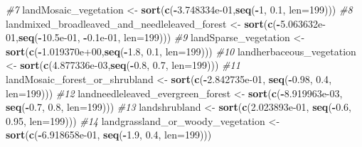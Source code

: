 \documentclass[
]{article}
\newenvironment{Shaded}{\begin{snugshade}}{\end{snugshade}}
\newcommand{\AttributeTok}[1]{\textcolor[rgb]{0.13,0.29,0.53}{#1}}
\newcommand{\CommentTok}[1]{\textcolor[rgb]{0.56,0.35,0.01}{\textit{#1}}}
\newcommand{\DecValTok}[1]{\textcolor[rgb]{0.00,0.00,0.81}{#1}}
\newcommand{\FloatTok}[1]{\textcolor[rgb]{0.00,0.00,0.81}{#1}}
\newcommand{\FunctionTok}[1]{\textcolor[rgb]{0.13,0.29,0.53}{\textbf{#1}}}
\newcommand{\NormalTok}[1]{#1}
\newcommand{\OtherTok}[1]{\textcolor[rgb]{0.56,0.35,0.01}{#1}}
\newcommand{\SpecialCharTok}[1]{\textcolor[rgb]{0.81,0.36,0.00}{\textbf{#1}}}
\begin{document}
\begin{Shaded}
\begin{Highlighting}[]
\CommentTok{\#7}
\NormalTok{landMosaic\_vegetation }\OtherTok{\textless{}{-}} \FunctionTok{sort}\NormalTok{(}\FunctionTok{c}\NormalTok{(}\SpecialCharTok{{-}}\FloatTok{3.748334e{-}01}\NormalTok{,}\FunctionTok{seq}\NormalTok{(}\SpecialCharTok{{-}}\DecValTok{1}\NormalTok{,  }\FloatTok{0.1}\NormalTok{, }\AttributeTok{len=}\DecValTok{199}\NormalTok{))) }
\CommentTok{\#8}
\NormalTok{landmixed\_broadleaved\_and\_needleleaved\_forest }\OtherTok{\textless{}{-}} \FunctionTok{sort}\NormalTok{(}\FunctionTok{c}\NormalTok{(}\SpecialCharTok{{-}}\FloatTok{5.063632e{-}01}\NormalTok{,}\FunctionTok{seq}\NormalTok{(}\SpecialCharTok{{-}}\FloatTok{10.5e{-}01}\NormalTok{, }\SpecialCharTok{{-}}\FloatTok{0.1e{-}01}\NormalTok{, }\AttributeTok{len=}\DecValTok{199}\NormalTok{))) }
\CommentTok{\#9}
\NormalTok{landSparse\_vegetation   }\OtherTok{\textless{}{-}} \FunctionTok{sort}\NormalTok{(}\FunctionTok{c}\NormalTok{(}\SpecialCharTok{{-}}\FloatTok{1.019370e+00}\NormalTok{,}\FunctionTok{seq}\NormalTok{(}\SpecialCharTok{{-}}\FloatTok{1.8}\NormalTok{, }\FloatTok{0.1}\NormalTok{, }\AttributeTok{len=}\DecValTok{199}\NormalTok{)))    }
\CommentTok{\#10}
\NormalTok{landherbaceous\_vegetation  }\OtherTok{\textless{}{-}} \FunctionTok{sort}\NormalTok{(}\FunctionTok{c}\NormalTok{(}\FloatTok{4.877336e{-}03}\NormalTok{,}\FunctionTok{seq}\NormalTok{(}\SpecialCharTok{{-}}\FloatTok{0.8}\NormalTok{, }\FloatTok{0.7}\NormalTok{, }\AttributeTok{len=}\DecValTok{199}\NormalTok{)))  }
\CommentTok{\#11}
\NormalTok{landMosaic\_forest\_or\_shrubland }\OtherTok{\textless{}{-}} \FunctionTok{sort}\NormalTok{(}\FunctionTok{c}\NormalTok{(}\SpecialCharTok{{-}}\FloatTok{2.842735e{-}01}\NormalTok{, }\FunctionTok{seq}\NormalTok{(}\SpecialCharTok{{-}}\FloatTok{0.98}\NormalTok{, }\FloatTok{0.4}\NormalTok{, }\AttributeTok{len=}\DecValTok{199}\NormalTok{)))  }
\CommentTok{\#12}
\NormalTok{landneedleleaved\_evergreen\_forest }\OtherTok{\textless{}{-}} \FunctionTok{sort}\NormalTok{(}\FunctionTok{c}\NormalTok{(}\SpecialCharTok{{-}}\FloatTok{8.919963e{-}03}\NormalTok{, }\FunctionTok{seq}\NormalTok{(}\SpecialCharTok{{-}}\FloatTok{0.7}\NormalTok{, }\FloatTok{0.8}\NormalTok{, }\AttributeTok{len=}\DecValTok{199}\NormalTok{)))  }
\CommentTok{\#13}
\NormalTok{landshrubland }\OtherTok{\textless{}{-}} \FunctionTok{sort}\NormalTok{(}\FunctionTok{c}\NormalTok{(}\FloatTok{2.023893e{-}01}\NormalTok{, }\FunctionTok{seq}\NormalTok{(}\SpecialCharTok{{-}}\FloatTok{0.6}\NormalTok{, }\FloatTok{0.95}\NormalTok{, }\AttributeTok{len=}\DecValTok{199}\NormalTok{)))  }
\CommentTok{\#14}
\NormalTok{landgrassland\_or\_woody\_vegetation }\OtherTok{\textless{}{-}} \FunctionTok{sort}\NormalTok{(}\FunctionTok{c}\NormalTok{(}\SpecialCharTok{{-}}\FloatTok{6.918658e{-}01}\NormalTok{, }\FunctionTok{seq}\NormalTok{(}\SpecialCharTok{{-}}\FloatTok{1.9}\NormalTok{, }\FloatTok{0.4}\NormalTok{, }\AttributeTok{len=}\DecValTok{199}\NormalTok{)))  }

\end{Highlighting}
\end{Shaded}
\end{document}
